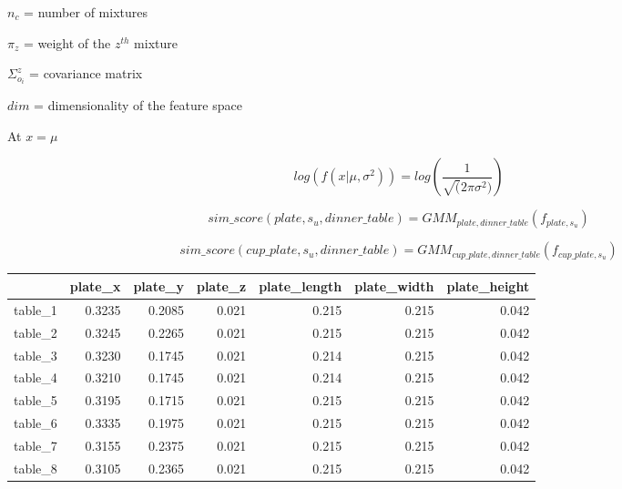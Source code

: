 \documentclass[12pt]{article}
\begin{document}
$n_c$ = number of mixtures

$\pi_z$ = weight of the $z^{th}$ mixture

$\Sigma_{o_i}^z$ = covariance matrix

$dim$ = dimensionality of the feature space

At $x = \mu$

\[log(f(x|\mu, \sigma^2)) = log(\frac{1}{\sqrt(2\pi\sigma^2)})\]

\[sim\_score(plate, s_u, dinner\_table) = GMM_{plate, dinner\_table}(f_{plate, s_u})\]

\[sim\_score(cup\_plate, s_u, dinner\_table) = GMM_{cup\_plate, dinner\_table}(f_{cup\_plate, s_u})\]

\begin{tabular}{lrrrrrr}
\toprule
{} &  plate\_x &  plate\_y &  plate\_z &  plate\_length &  plate\_width &  plate\_height \\
\midrule
table\_1 &            0.3235 &            0.2085 &             0.021 &         0.215 &        0.215 &         0.042 \\
table\_2 &            0.3245 &            0.2265 &             0.021 &         0.215 &        0.215 &         0.042 \\
table\_3 &            0.3230 &            0.1745 &             0.021 &         0.214 &        0.215 &         0.042 \\
table\_4 &            0.3210 &            0.1745 &             0.021 &         0.214 &        0.215 &         0.042 \\
table\_5 &            0.3195 &            0.1715 &             0.021 &         0.215 &        0.215 &         0.042 \\
table\_6 &            0.3335 &            0.1975 &             0.021 &         0.215 &        0.215 &         0.042 \\

table\_7 &            0.3155 &            0.2375 &             0.021 &         0.215 &        0.215 &         0.042 \\
table\_8 &            0.3105 &            0.2365 &             0.021 &         0.215 &        0.215 &         0.042 \\
\bottomrule
\end{tabular}
\end{document}

